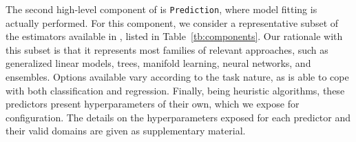 The second high-level component of \isklearn is \texttt{\small Prediction}, where model fitting is actually performed. For this component, we consider a representative subset of the estimators available in \sklearn, listed in Table~\ref{tb:components}. Our rationale with this subset is that it represents most families of relevant approaches, such as generalized linear models, trees, manifold learning, neural networks, and ensembles. Options available vary according to the task nature, as \isklearn is able to cope with both classification and regression.
Finally, being heuristic algorithms, these predictors present hyperparameters of their own, which we expose for configuration. The details on the hyperparameters exposed for each predictor and their valid domains are given as supplementary material.